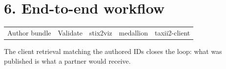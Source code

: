 \documentclass[11pt,letterpaper]{article}
\newcommand{\labpart}[1]{%
  \par\vspace{0.35em}%
  \Needspace{8\baselineskip}%
  \section*{#1}%
  \nopagebreak
}
\begin{document}
\labpart{6. End-to-end workflow}

\begin{center}
\small
\begin{tabular}{@{}c@{ $\rightarrow$ }c@{ $\rightarrow$ }c@{ $\rightarrow$ }c@{ $\rightarrow$ }c@{}}
Author bundle & Validate & stix2viz & medallion & taxii2-client \\
\end{tabular}
\end{center}

The client retrieval matching the authored IDs closes the loop: what was published is what a partner would receive.
\end{document}
